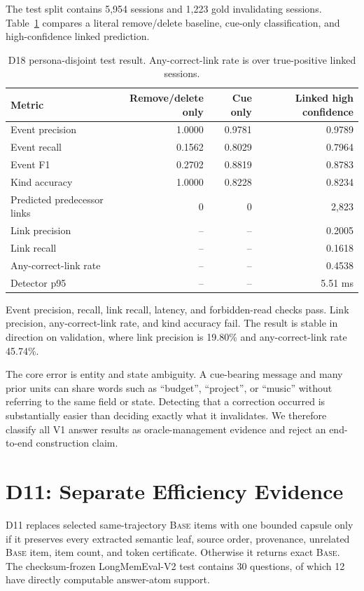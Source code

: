 \documentclass[10pt]{article}
\newcommand{\base}{\textsc{Base}\xspace}
\begin{document}
The test split contains 5,954 sessions and 1,223 gold invalidating sessions. Table~\ref{tab:d18} compares a literal remove/delete baseline, cue-only classification, and high-confidence linked prediction.

\begin{table}[H]
\centering
\footnotesize
\begin{tabular}{lrrr}
\toprule
Metric & Remove/delete only & Cue only & Linked high confidence \\
\midrule
Event precision & 1.0000 & 0.9781 & 0.9789 \\
Event recall & 0.1562 & 0.8029 & 0.7964 \\
Event F1 & 0.2702 & 0.8819 & 0.8783 \\
Kind accuracy & 1.0000 & 0.8228 & 0.8234 \\
Predicted predecessor links & 0 & 0 & 2,823 \\
Link precision & -- & -- & 0.2005 \\
Link recall & -- & -- & 0.1618 \\
Any-correct-link rate & -- & -- & 0.4538 \\
Detector p95 & -- & -- & 5.51 ms \\
\bottomrule
\end{tabular}
\caption{D18 persona-disjoint test result. Any-correct-link rate is over true-positive linked sessions.}
\label{tab:d18}
\end{table}

Event precision, recall, link recall, latency, and forbidden-read checks pass. Link precision, any-correct-link rate, and kind accuracy fail. The result is stable in direction on validation, where link precision is 19.80\% and any-correct-link rate 45.74\%.

The core error is entity and state ambiguity. A cue-bearing message and many prior units can share words such as ``budget'', ``project'', or ``music'' without referring to the same field or state. Detecting that a correction occurred is substantially easier than deciding exactly what it invalidates. We therefore classify all V1 answer results as oracle-management evidence and reject an end-to-end construction claim.

\section{D11: Separate Efficiency Evidence}
\label{sec:d11eff}

D11 replaces selected same-trajectory \base items with one bounded capsule only if it preserves every extracted semantic leaf, source order, provenance, unrelated \base item, item count, and token certificate. Otherwise it returns exact \base. The checksum-frozen LongMemEval-V2 test contains 30 questions, of which 12 have directly computable answer-atom support.
\end{document}
